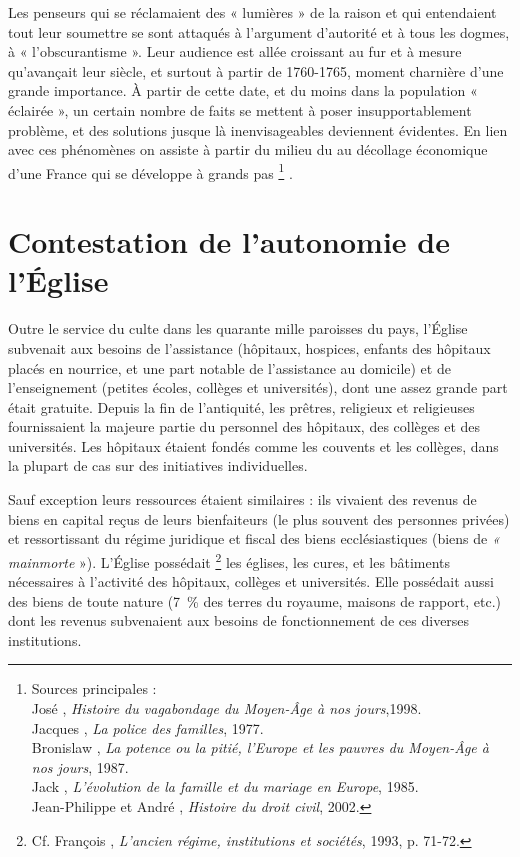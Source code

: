 

 Les penseurs qui se réclamaient des « lumières » de la raison et qui entendaient tout leur soumettre se sont attaqués à l'argument d'autorité et à tous les dogmes, à « l'obscurantisme ». Leur audience est allée croissant au fur et à mesure qu'avançait leur siècle, et surtout à partir de 1760-1765, moment charnière d'une grande importance. À partir de cette date, et du moins dans la population « éclairée », un certain nombre de faits se mettent à poser insupportablement problème, et des solutions jusque là inenvisageables deviennent évidentes. En lien avec ces phénomènes on assiste à partir du milieu du  au décollage économique d'une France qui se développe à grands pas%
\footnote{Sources principales :
\\José , \emph{Histoire du vagabondage du Moyen-Âge à nos jours},1998.
\\Jacques {}, \emph{La police des familles}, 1977.
\\Bronislaw {}, \emph{La potence ou la pitié, l'Europe et les pauvres du Moyen-Âge à nos jours}, 1987.
\\Jack {}, \emph{L'évolution de la famille et du mariage en Europe}, 1985.
\\Jean-Philippe  et André , \emph{Histoire du droit civil}, 2002.}%
.

 
\section{Contestation de l'autonomie de l'Église}

 Outre le service du culte dans les quarante mille paroisses du pays, l'Église subvenait aux besoins de l'assistance (hôpitaux, hospices, enfants des hôpitaux placés en nourrice, et une part notable de l'assistance au domicile) et de l'enseignement (petites écoles, collèges et universités), dont une assez grande part était gratuite. Depuis la fin de l'antiquité, les prêtres, religieux et religieuses fournissaient la majeure partie du personnel des hôpitaux, des collèges et des universités. Les hôpitaux étaient fondés comme les couvents et les collèges, dans la plupart de cas sur des initiatives individuelles. 

 Sauf exception leurs ressources étaient similaires : ils vivaient des revenus de biens en capital reçus de leurs bienfaiteurs (le plus souvent des personnes privées) et ressortissant du régime juridique et fiscal des biens ecclésiastiques (biens de \emph{« mainmorte} »). L'Église possédait%
\footnote{Cf. François , \emph{L'ancien régime, institutions et sociétés}, 1993, p. 71-72.} 
les églises, les cures, et les bâtiments nécessaires à l'activité des hôpitaux, collèges et universités. Elle possédait aussi des biens de toute nature (7~\% des terres du royaume, maisons de rapport, etc.) dont les revenus subvenaient aux besoins de fonctionnement de ces diverses institutions. 

